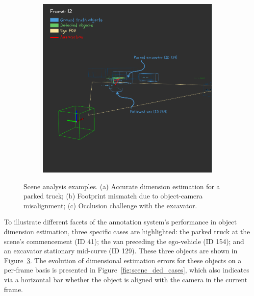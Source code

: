 \begin{figure}[h!]
\begin{subfigure}[b]{0.32\textwidth}
        \caption{}
        \label{fig:scene_open3d_cases_b}
    \end{subfigure}
    \hfill
    \begin{subfigure}[b]{0.32\textwidth}
        \includegraphics[width=\textwidth]{images/experiments/evaluation_frames/3d_evaluation_frame_12_excavator_problem_canva.png}
        \caption{}
        \label{fig:scene_open3d_cases_c}
    \end{subfigure}
    \caption{Scene analysis examples. (a) Accurate dimension estimation for a parked truck; (b) Footprint mismatch due to object-camera misalignment; (c) Occlusion challenge with the excavator.}
    \label{fig:scene_open3d_cases}
\end{figure}

To illustrate different facets of the annotation system's performance in object dimension estimation, three specific cases are highlighted: the parked truck at the scene's commencement (ID 41); the van preceding the ego-vehicle (ID 154); and an excavator stationary mid-curve (ID 129). These three objects are shown in Figure~\ref{fig:scene_open3d_cases}. The evolution of dimensional estimation errors for these objects on a per-frame basis is presented in Figure~\ref{fig:scene_ded_cases}, which also indicates via a horizontal bar whether the object is aligned with the camera in the current frame.

